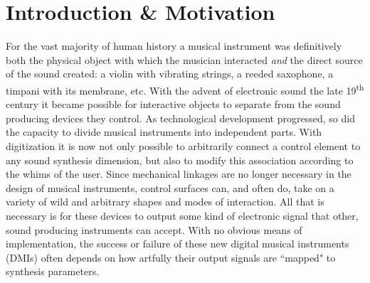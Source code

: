 

\chapter{Introduction \& Motivation}
For the vast majority of human history a musical instrument was definitively both the physical object with which the musician interacted \emph{and} the direct source of the sound created: a violin with vibrating strings, a reeded saxophone, a timpani with its membrane, etc.  With the advent of electronic sound the late 19\textsuperscript{th} century 
it became possible for interactive objects to separate from the sound producing devices they control. %
As technological development progressed, so did the capacity to divide musical instruments into independent parts. With digitization it is now not only possible to arbitrarily connect a control element to any sound synthesis dimension, but also to modify this association according to the whims of the user. Since mechanical linkages are no longer necessary in the design of musical instruments, control surfaces can, and often do, take on a variety of wild and arbitrary shapes and modes of interaction. %
All that is necessary is for these devices to output some kind of electronic signal that other, sound producing instruments can accept. With no obvious means of implementation, the success or failure of these new digital musical instruments (DMIs) often depends on how artfully their output signals are ``mapped" to synthesis parameters.

